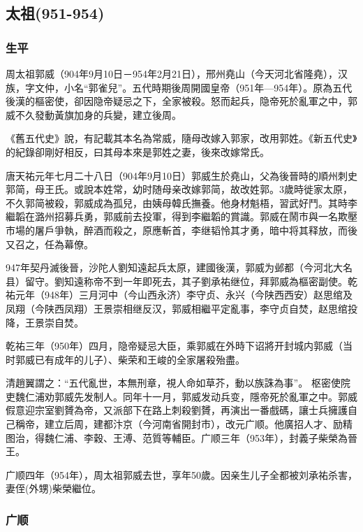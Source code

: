
\subsection{太祖\tiny(951-954)}

\subsubsection{生平}

周太祖郭威（904年9月10日－954年2月21日），邢州堯山（今天河北省隆堯），汉族，字文仲，小名“郭雀兒”。五代時期後周開國皇帝（951年—954年）。原為五代後漢的樞密使，卻因隐帝疑忌之下，全家被殺。怒而起兵，隐帝死於亂軍之中，郭威不久發動黃旗加身的兵變，建立後周。

《舊五代史》說，有記載其本名為常威，隨母改嫁入郭家，改用郭姓。《新五代史》的紀錄卻剛好相反，曰其母本來是郭姓之妻，後來改嫁常氏。

唐天祐元年七月二十八日（904年9月10日）郭威生於堯山，父為後晉時的順州刺史郭简，母王氏。或說本姓常，幼时随母亲改嫁郭简，故改姓郭。3歲時徙家太原，不久郭简被殺，郭威成為孤兒，由姨母韓氏撫養。他身材魁梧，習武好鬥。其時李繼韜在潞州招募兵勇，郭威前去投軍，得到李繼韜的賞識。郭威在鬧市與一名欺壓市場的屠戶爭執，醉酒而殺之，原應斬首，李继韬怜其才勇，暗中将其释放，而後又召之，任為幕僚。

947年契丹滅後晉，沙陀人劉知遠起兵太原，建國後漢，郭威为邺都（今河北大名县）留守。劉知遠称帝不到一年即死去，其子劉承祐继位，拜郭威為樞密副使。乾祐元年（948年）三月河中（今山西永济）李守贞、永兴（今陕西西安）赵思绾及凤翔（今陕西凤翔）王景崇相继反汉，郭威相繼平定亂事，李守贞自焚，赵思绾投降，王景崇自焚。

乾祐三年（950年）四月，隐帝疑忌大臣，乘郭威在外時下诏將开封城内郭威（当时郭威已有成年的儿子）、柴荣和王峻的全家屠殺殆盡。

清趙翼謂之：“五代亂世，本無刑章，視人命如草芥，動以族誅為事”。 枢密使院吏魏仁浦劝郭威先发制人。同年十一月，郭威发动兵变，隱帝死於亂軍之中。郭威假意迎宗室劉贇為帝，又派部下在路上刺殺劉贇，再演出一番戲碼，讓士兵擁護自己稱帝，建立后周，建都汴京（今河南省開封市），改元广顺。他廣招人才、励精图治，得魏仁浦、李穀、王溥、范質等輔臣。广顺三年（953年），封義子柴榮為晉王。

广顺四年（954年），周太祖郭威去世，享年50歲。因亲生儿子全都被刘承祐杀害，妻侄(外甥)柴榮繼位。


\subsubsection{广顺}

